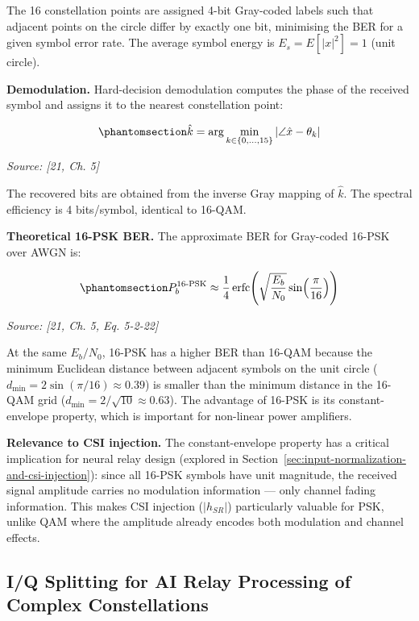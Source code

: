 The 16 constellation points are assigned 4-bit Gray-coded labels such that adjacent points on the circle differ by exactly one bit, minimising the BER for a given symbol error rate. The average symbol energy is \(E_s = E[|x|^2] = 1\) (unit circle).

\textbf{Demodulation.} Hard-decision demodulation computes the phase of the received symbol and assigns it to the nearest constellation point:

\begin{equation}\protect\phantomsection\label{eq:psk16-decision}{\hat{k} = \arg\min_{k \in \{0,\ldots,15\}} \left| \angle \hat{x} - \theta_k \right|
}\end{equation} \par{\small\textit{Source: [21, Ch. 5]}}

The recovered bits are obtained from the inverse Gray mapping of \(\hat{k}\). The spectral efficiency is 4 bits/symbol, identical to 16-QAM.

\textbf{Theoretical 16-PSK BER.} The approximate BER for Gray-coded 16-PSK over AWGN is:

\begin{equation}\protect\phantomsection\label{eq:psk16-ber}{P_b^{\text{16-PSK}} \approx \frac{1}{4} \operatorname{erfc}\!\left(\sqrt{\frac{E_b}{N_0}} \sin\!\left(\frac{\pi}{16}\right)\right)
}\end{equation} \par{\small\textit{Source: [21, Ch. 5, Eq. 5-2-22]}}

At the same \(E_b/N_0\), 16-PSK has a higher BER than 16-QAM because the minimum Euclidean distance between adjacent symbols on the unit circle (\(d_{\min} = 2\sin(\pi/16) \approx 0.39\)) is smaller than the minimum distance in the 16-QAM grid (\(d_{\min} = 2/\sqrt{10} \approx 0.63\)). The advantage of 16-PSK is its constant-envelope property, which is important for non-linear power amplifiers.

\textbf{Relevance to CSI injection.} The constant-envelope property has a critical implication for neural relay design (explored in Section~\ref{sec:input-normalization-and-csi-injection}): since all 16-PSK symbols have unit magnitude, the received signal amplitude carries no modulation information --- only channel fading information. This makes CSI injection (\(|h_{SR}|\)) particularly valuable for PSK, unlike QAM where the amplitude already encodes both modulation and channel effects.

\subsection{I/Q Splitting for AI Relay Processing of Complex Constellations}\label{sec:iq-splitting-for-ai-relay-processing-of-complex-constellations}

